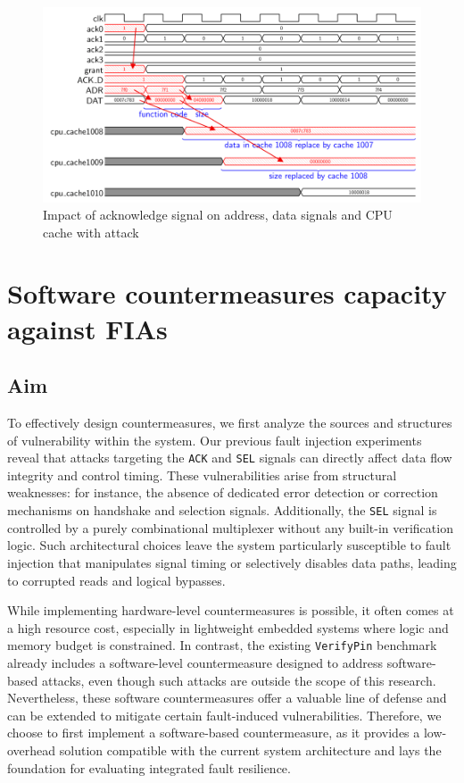 \begin{figure}[t!]
  \centering
  \includegraphics[width=\linewidth]{Chapitre4/figures/fault2.png}
  \caption{Impact of acknowledge signal on address, data signals and CPU cache with attack}
  \label{fault2}
\end{figure}

\section{Software countermeasures capacity against FIAs}

\subsection{Aim}
To effectively design countermeasures, we first analyze the sources and structures of vulnerability within the system. Our previous fault injection experiments reveal that attacks targeting the \texttt{ACK} and \texttt{SEL} signals can directly affect data flow integrity and control timing. These vulnerabilities arise from structural weaknesses: for instance, the absence of dedicated error detection or correction mechanisms on handshake and selection signals. Additionally, the \texttt{SEL} signal is controlled by a purely combinational multiplexer without any built-in verification logic. Such architectural choices leave the system particularly susceptible to fault injection that manipulates signal timing or selectively disables data paths, leading to corrupted reads and logical bypasses.

While implementing hardware-level countermeasures is possible, it often comes at a high resource cost, especially in lightweight embedded systems where logic and memory budget is constrained. In contrast, the existing \texttt{VerifyPin} benchmark already includes a software-level countermeasure designed to address software-based attacks, even though such attacks are outside the scope of this research. Nevertheless, these software countermeasures offer a valuable line of defense and can be extended to mitigate certain fault-induced vulnerabilities. Therefore, we choose to first implement a software-based countermeasure, as it provides a low-overhead solution compatible with the current system architecture and lays the foundation for evaluating integrated fault resilience.

